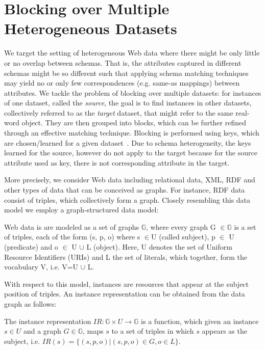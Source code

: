 \section{Blocking over Multiple Heterogeneous Datasets}
We target the setting of heterogeneous Web data where there might be only little or no overlap between schemas. That is, the attributes captured in different schemas might be so different such that applying schema matching techniques may yield no or only few correspondences (e.g. same-as mappings) between attributes. We tackle the problem of blocking over multiple datasets: for instances of one dataset, called the \emph{source}, the goal is to find instances in other datasets, collectively referred to as the \emph{target} dataset, that might refer to the same real-word object. They are then grouped into blocks, which can be further refined through an effective matching technique. Blocking is performed using keys, which are chosen/learned for a given dataset~\cite{}.   Due to schema heterogeneity, the keys learned for the source, however do not apply to the target because for the source attribute used as key, there is not corresponding attribute in the target. 

More precisely, we consider Web data including relational data, XML, RDF and other types of data that can be conceived as graphs. 
For instance, RDF data consist of triples, which collectively form a graph. Closely resembling this data model
we employ a graph-structured data model: 
\begin{definition} Web data is are modeled as a set of graphs $\mathbb{G}$, where every graph G $\in\mathbb{G}$ is a set of triples, each of the form (s, p, o) where s $\in$U (called subject), p $\in$ U (predicate) and o $\in$ U $\cup$ L (object). Here, U denotes the set of Uniform Resource Identifiers (URIs) and L the set of literals, which together, form the vocabulary V, i.e. V=U $\cup$ L.  
\end{definition} 

With respect to this model, instances are resources that appear at the subject position of triples. An instance representation can be obtained from the data graph as follows:

\begin{definition} The instance representation $IR: \mathbb{G} \times U \rightarrow \mathbb{G}$ is a function, which given an instance $s \in U$ and a graph $G \in \mathbb{G}$, maps $s$ to a set of triples in which $s$ appears as the subject, i.e. $IR(s) = \{ (s, p, o) | (s, p, o) \in G, o \in L \}$. 
\end{definition} 


